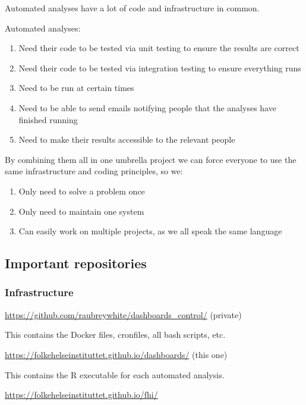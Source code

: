 \documentclass[12pt,]{article}
\providecommand{\tightlist}{%
  \setlength{\itemsep}{0pt}\setlength{\parskip}{0pt}}
\begin{document}
Automated analyses have a lot of code and infrastructure in common.

Automated analyses:

\begin{enumerate}
\def\labelenumi{\arabic{enumi}.}
\tightlist
\item
  Need their code to be tested via unit testing to ensure the results
  are correct
\item
  Need their code to be tested via integration testing to ensure
  everything runs
\item
  Need to be run at certain times
\item
  Need to be able to send emails notifying people that the analyses have
  finished running
\item
  Need to make their results accessible to the relevant people
\end{enumerate}

By combining them all in one umbrella project we can force everyone to
use the same infrastructure and coding principles, so we:

\begin{enumerate}
\def\labelenumi{\arabic{enumi}.}
\tightlist
\item
  Only need to solve a problem once
\item
  Only need to maintain one system
\item
  Can easily work on multiple projects, as we all speak the same
  language
\end{enumerate}

\subsection{Important repositories}\label{important-repositories}

\subsubsection{Infrastructure}\label{infrastructure}

\url{https://github.com/raubreywhite/dashboards_control/} (private)

This contains the Docker files, cronfiles, all bash scripts, etc.

\url{https://folkehelseinstituttet.github.io/dashboards/} (this one)

This contains the R executable for each automated analysis.

\url{https://folkehelseinstituttet.github.io/fhi/}
\end{document}
